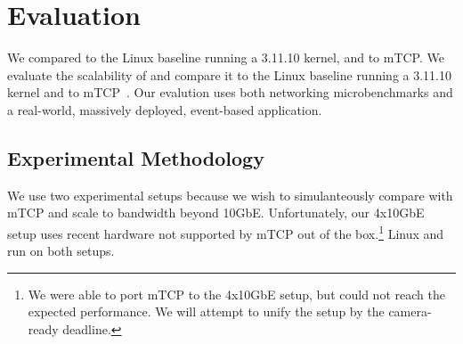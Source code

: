 
\section{Evaluation}
\label{sec:eval}

We compared \ix to the Linux baseline running a 3.11.10 kernel, and to
mTCP\@. We evaluate the scalability of \ix and compare it to the Linux
baseline running a 3.11.10 kernel and to mTCP~\cite{jeong2014mtcp}. 
Our evalution uses both networking microbenchmarks and a real-world,
massively deployed, event-based application. 



\subsection{Experimental Methodology}
\label{sec:eval:setup}

We use two experimental setups because we wish to simulanteously
compare with mTCP and scale to bandwidth beyond 10GbE.  Unfortunately,
our 4x10GbE setup uses recent hardware not supported by mTCP out of the
box.\footnote{We were able to port mTCP to the 4x10GbE setup, but
  could not reach the expected performance.  We will attempt to unify
  the setup by the camera-ready deadline.}  Linux and \ix run on both
setups.



